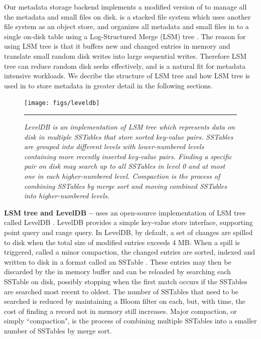 Our metadata storage backend implements a modified version of \tfs
to manage all the metadata and small files on disk.
\tfs \cite{TableFS} is a stacked file system which uses another file system
as an object store, and organizes all metadata and small files in to a single
on-disk table using a Log-Structured Merge (LSM) tree \cite{ONeil1996}.
The reason for using LSM tree is that it buffers new and changed entries in
memory and translate small random disk writes into large sequential writes.
Therefore LSM tree can reduce random disk seeks effectively, and is a natural
fit for metadata intensive workloads. We decribe the structure of LSM tree
and how LSM tree is used in \tfs to store metadata in greater detail
in the following sections.

\begin{figure}[t]
\texttt{[image: figs/leveldb]}
\vspace{10pt}
\caption{\textit{
LevelDB is an implementation of LSM tree which represents data on disk
in multiple SSTables that store sorted key-value pairs.
SSTables are grouped into different levels with lower-numbered levels
containing more recently inserted key-value pairs.
Finding a specific pair on disk may search up to all SSTables in level 0
and at most one in each higher-numbered level.
Compaction is the process of combining SSTables
by merge sort and moving combined SSTables into higher-numbered levels.
}}
\vspace{10pt}
\hrule
\label{fig:leveldb}
\end{figure}


\textbf{LSM tree and LevelDB --}
\tfs uses an open-source implementation of LSM tree called LevelDB
\cite{LevelDB}. LevelDB provides a simple key-value store interface,
supporting point query and range query. In LevelDB, by default,
a set of changes are spilled to disk when the total size of modified
entries exceeds 4 MB.  When a spill is triggered, called a
minor compaction, the changed entries are sorted, indexed and written to disk
in a format called an SSTable \cite{BigTable}.  These entries may then be
discarded by the in memory buffer and can be reloaded by searching each SSTable
on disk, possibly stopping when the first match occurs if the SSTables are
searched most recent to oldest.  The number of SSTables that need to be
searched is reduced by maintaining a Bloom filter\cite{bloomfilter} on each,
but, with time, the cost of finding a record not in memory still increases.
Major compaction, or simply ``compaction",
is the process of combining multiple SSTables
into a smaller number of SSTables by merge sort.

